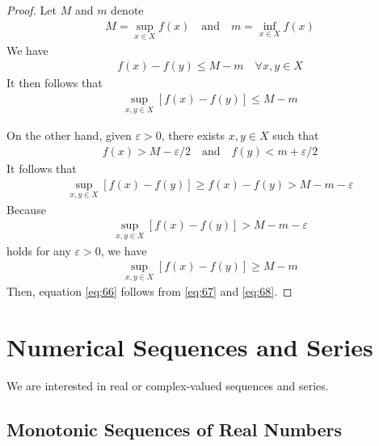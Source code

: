 \documentclass[thmcnt=section, 12pt]{my-elegantbook}
\begin{document}
\begin{proof}
    Let $M$ and $m$ denote 
    \begin{align*}
        M = \sup_{x \in X} f(x)
        \quad\text{and}\quad
        m = \inf_{x \in X} f(x)
    \end{align*}
    We have 
    \begin{align*}
        f(x) - f(y) \leq M - m
        \quad \forall x,y \in X
    \end{align*}
    It then follows that 
    \begin{align}
        \sup_{x,y \in X} [f(x) - f(y)]
        \leq M - m
        \label{eq:67}
    \end{align}

    On the other hand, given $\varepsilon > 0$, there exists $x, y \in X$ such that 
    \begin{align}
        f(x) > M - \varepsilon / 2
        \quad \text{and} \quad 
        f(y) < m + \varepsilon / 2
    \end{align} 
    It follows that 
    \begin{align*}
        \sup_{x,y \in X} [f(x) - f(y)]
        \geq f(x) - f(y)
        > M - m - \varepsilon
    \end{align*}
    Because 
    \begin{align*}
        \sup_{x,y \in X} [f(x) - f(y)]
        > M - m - \varepsilon
    \end{align*}
    holds for any $\varepsilon > 0$, we have 
    \begin{align}
        \sup_{x,y \in X} [f(x) - f(y)]
        \geq M - m
        \label{eq:68}
    \end{align}
    Then, equation \eqref{eq:66} follows from \eqref{eq:67} and \eqref{eq:68}.
\end{proof}


\chapter{Numerical Sequences and Series}

We are interested in real or complex-valued sequences and series.


\section{Monotonic Sequences of Real Numbers}
\end{document}
